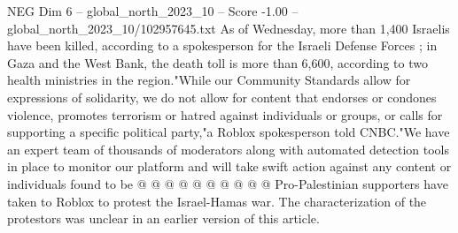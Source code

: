 \begin{textsample}{NEG Dim 6 – global\_north\_2023\_10 – Score -1.00 – global\_north\_2023\_10/102957645.txt}
As of Wednesday, more than 1,400 Israelis have been killed, according to a spokesperson for the Israeli Defense Forces ; in Gaza and the West Bank, the death toll is more than 6,600, according to two health ministries in the region."While our Community Standards allow for expressions of solidarity, we do not allow for content that endorses or condones violence, promotes terrorism or hatred against individuals or groups, or calls for supporting a specific political party,"a Roblox spokesperson told CNBC."We have an expert team of thousands of moderators along with automated detection tools in place to monitor our platform and will take swift action against any content or individuals found to be @ @ @ @ @ @ @ @ @ @ Pro-Palestinian supporters have taken to Roblox to protest the Israel-Hamas war.
The characterization of the protestors was unclear in an earlier version of this article.

\end{textsample}
